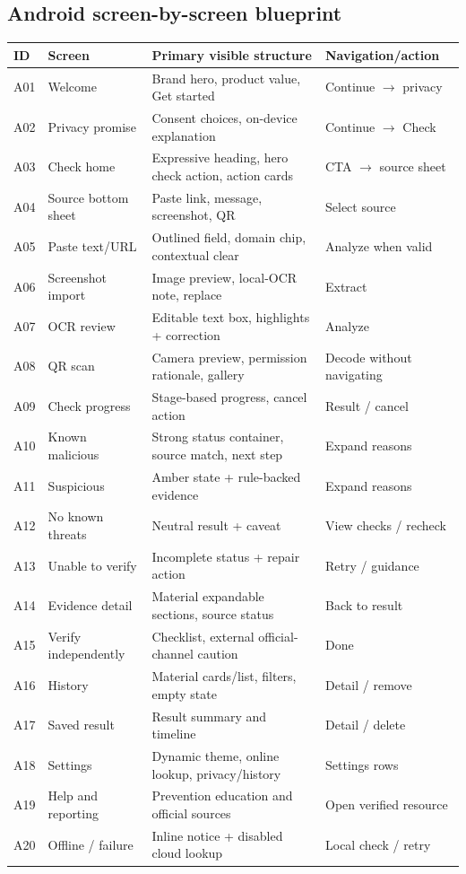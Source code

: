 \documentclass[10pt,a4paper]{article}
\begin{document}
\subsection{Android screen-by-screen blueprint}
\small
\begin{longtable}{@{}p{10mm}p{40mm}p{62mm}p{46mm}@{}}\toprule
\textbf{ID} & \textbf{Screen} & \textbf{Primary visible structure} & \textbf{Navigation/action} \\ \midrule\endhead
A01 & Welcome & Brand hero, product value, Get started & Continue $\rightarrow$ privacy \\ \midrule
A02 & Privacy promise & Consent choices, on-device explanation & Continue $\rightarrow$ Check \\ \midrule
A03 & Check home & Expressive heading, hero check action, action cards & CTA $\rightarrow$ source sheet \\ \midrule
A04 & Source bottom sheet & Paste link, message, screenshot, QR & Select source \\ \midrule
A05 & Paste text/URL & Outlined field, domain chip, contextual clear & Analyze when valid \\ \midrule
A06 & Screenshot import & Image preview, local-OCR note, replace & Extract \\ \midrule
A07 & OCR review & Editable text box, highlights + correction & Analyze \\ \midrule
A08 & QR scan & Camera preview, permission rationale, gallery & Decode without navigating \\ \midrule
A09 & Check progress & Stage-based progress, cancel action & Result / cancel \\ \midrule
A10 & Known malicious & Strong status container, source match, next step & Expand reasons \\ \midrule
A11 & Suspicious & Amber state + rule-backed evidence & Expand reasons \\ \midrule
A12 & No known threats & Neutral result + caveat & View checks / recheck \\ \midrule
A13 & Unable to verify & Incomplete status + repair action & Retry / guidance \\ \midrule
A14 & Evidence detail & Material expandable sections, source status & Back to result \\ \midrule
A15 & Verify independently & Checklist, external official-channel caution & Done \\ \midrule
A16 & History & Material cards/list, filters, empty state & Detail / remove \\ \midrule
A17 & Saved result & Result summary and timeline & Detail / delete \\ \midrule
A18 & Settings & Dynamic theme, online lookup, privacy/history & Settings rows \\ \midrule
A19 & Help and reporting & Prevention education and official sources & Open verified resource \\ \midrule
A20 & Offline / failure & Inline notice + disabled cloud lookup & Local check / retry \\ \bottomrule
\end{longtable}
\normalsize
\end{document}
